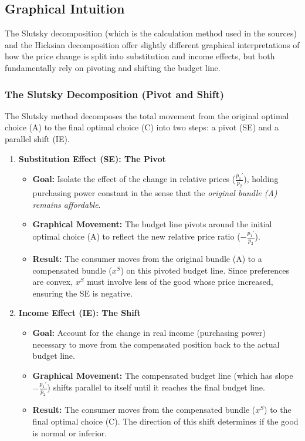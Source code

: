 \documentclass{article}
\begin{document}
\subsection{Graphical Intuition}

The Slutsky decomposition (which is the calculation method used in the sources) and the Hicksian decomposition offer slightly different graphical interpretations of how the price change is split into substitution and income effects, but both fundamentally rely on pivoting and shifting the budget line.

\subsubsection*{The Slutsky Decomposition (Pivot and Shift)}

The Slutsky method decomposes the total movement from the original optimal choice (A) to the final optimal choice (C) into two steps: a pivot (SE) and a parallel shift (IE).

\begin{enumerate}
    \item \textbf{Substitution Effect (SE): The Pivot}
    \begin{itemize}
        \item \textbf{Goal:} Isolate the effect of the change in relative prices ($\frac{p_1'}{p_2}$), holding purchasing power constant in the sense that the \textit{original bundle (A) remains affordable}.
        \item \textbf{Graphical Movement:} The budget line pivots around the initial optimal choice (A) to reflect the new relative price ratio ($-\frac{p_1'}{p_2}$).
        \item \textbf{Result:} The consumer moves from the original bundle (A) to a compensated bundle ($x^S$) on this pivoted budget line. Since preferences are convex, $x^S$ must involve less of the good whose price increased, ensuring the SE is negative.
    \end{itemize}
    \item \textbf{Income Effect (IE): The Shift}
    \begin{itemize}
        \item \textbf{Goal:} Account for the change in real income (purchasing power) necessary to move from the compensated position back to the actual budget line.
        \item \textbf{Graphical Movement:} The compensated budget line (which has slope $-\frac{p_1'}{p_2}$) shifts parallel to itself until it reaches the final budget line.
        \item \textbf{Result:} The consumer moves from the compensated bundle ($x^S$) to the final optimal choice (C). The direction of this shift determines if the good is normal or inferior.
    \end{itemize}
\end{enumerate}
\end{document}
